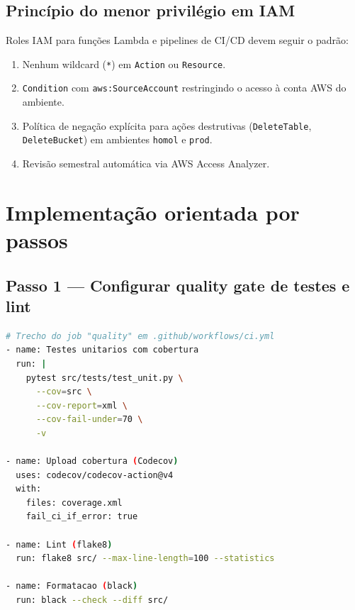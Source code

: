 \subsection{Princ\'ipio do menor privil\'egio em IAM}

Roles IAM para fun\c{c}\~oes Lambda e pipelines
de CI/CD devem seguir o padr\~ao:

\begin{enumerate}[leftmargin=*]
  \item Nenhum wildcard (\texttt{*}) em \texttt{Action} ou \texttt{Resource}.
  \item \texttt{Condition} com \texttt{aws:SourceAccount} restringindo
        o acesso \`a conta AWS do ambiente.
  \item Pol\'itica de nega\c{c}\~ao expl\'icita para a\c{c}\~oes
        destrutivas (\texttt{DeleteTable}, \texttt{DeleteBucket}) em
        ambientes \texttt{homol} e \texttt{prod}.
  \item Revis\~ao semestral autom\'atica via AWS Access Analyzer.
\end{enumerate}

\section{Implementa\c{c}\~ao orientada por passos}

\subsection{Passo 1 --- Configurar quality gate de testes e lint}

\begin{lstlisting}[language=bash,
  caption={Job de quality gate no GitHub Actions com cobertura e lint.},
  label={lst:quality_gate}]
# Trecho do job "quality" em .github/workflows/ci.yml
- name: Testes unitarios com cobertura
  run: |
    pytest src/tests/test_unit.py \
      --cov=src \
      --cov-report=xml \
      --cov-fail-under=70 \
      -v

- name: Upload cobertura (Codecov)
  uses: codecov/codecov-action@v4
  with:
    files: coverage.xml
    fail_ci_if_error: true

- name: Lint (flake8)
  run: flake8 src/ --max-line-length=100 --statistics

- name: Formatacao (black)
  run: black --check --diff src/
\end{lstlisting}

